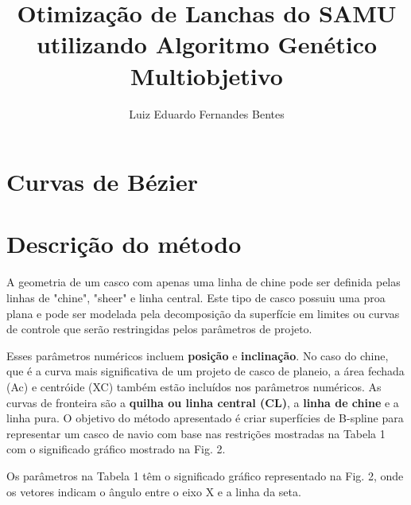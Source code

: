 \documentclass[]{article}
\title{Otimização de Lanchas do SAMU utilizando Algoritmo Genético Multiobjetivo}
\author{Luiz Eduardo Fernandes Bentes}
\begin{document}
\maketitle

\begin{abstract}

\end{abstract}
\section{Curvas de Bézier}

\section{Descrição do método}
A geometria de um casco com apenas uma linha de chine pode ser definida pelas linhas de "chine", "sheer" e linha central. Este tipo de casco possuiu uma proa plana e pode ser modelada pela decomposição da superfície em limites ou curvas de controle que serão restringidas pelos parâmetros de projeto.

Esses parâmetros numéricos incluem \textbf{posição} e \textbf{inclinação}. No caso do chine, que é a curva mais significativa de um projeto de casco de planeio, a área fechada (Ac) e centróide (XC) também estão incluídos nos parâmetros numéricos. As curvas de fronteira são a \textbf{quilha ou linha central (CL)}, a \textbf{linha de chine} e a linha pura. O objetivo do método apresentado é criar superfícies de B-spline para representar um casco de navio com base nas restrições mostradas na Tabela 1 com o significado gráfico mostrado na Fig. 2. 

Os parâmetros na Tabela 1 têm o significado gráfico representado na Fig. 2, onde os vetores indicam o ângulo entre o eixo X e a linha da seta.
\end{document}
